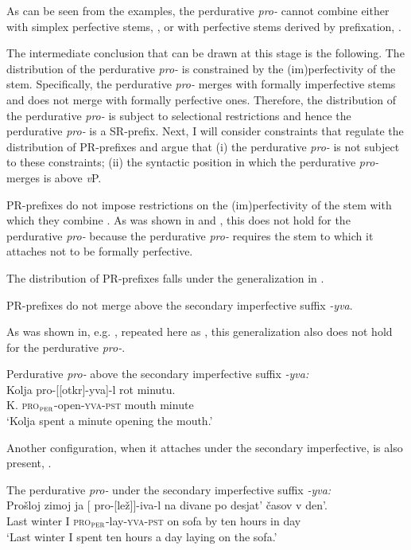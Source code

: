 \documentclass[output=paper,
]{langscibook}
\begin{document}
\noindent As can be seen from the examples, the perdurative \textit{pro-} cannot combine either with simplex perfective stems, , or with perfective stems derived by prefixation, .


The intermediate conclusion that can be drawn at this stage is the following. The distribution of the perdurative \textit{pro-} is constrained by the (im)perfectivity of the stem. Specifically, the perdurative \textit{pro-} merges with formally imperfective stems and does not merge with formally perfective ones. Therefore, the distribution of the perdurative \textit{pro-} is subject to selectional restrictions and hence the perdurative \textit{pro-} is a SR-prefix. Next, I will consider constraints that regulate the distribution of PR-prefixes and argue that (i) the perdurative \textit{pro-} is not subject to these constraints; (ii) the syntactic position in which the perdurative \textit{pro-} merges is above \textit{v}P.

PR-prefixes do not impose restrictions on the (im)perfectivity of the stem with which they combine \citep{tatevosov2009mnozestvennaja,tatevosov2013mnozestvennaja}. As was shown in  and , this does not hold for the perdurative \textit{pro-} because the perdurative \textit{pro-} requires the stem to which it attaches not to be formally perfective.

The distribution of PR-prefixes falls under the generalization in .

\ea \label{ex:naumov:15}
PR-prefixes do not merge above the secondary imperfective suffix \textit{-yva}.
\z

\noindent As was shown in, e.g. , repeated here as , this generalization also does not hold for the perdurative \textit{pro-}.
 

 \ea Perdurative \textit{pro-} above the secondary imperfective suffix \textit{-yva:}\label{ex:naumov:16}\smallskip\\
     \gll Kolja	pro-[[otkr]-yva]-l		rot		minutu.\\
K.	\textsc{pro}$_\textsc{per}$-open-\textsc{yva}-\textsc{pst}	mouth		minute\\
     \glt `Kolja spent a minute opening the mouth.'
     \z


\noindent Another configuration, when it attaches under the secondary imperfective, is also present, .

\ea The perdurative \textit{pro-} under the secondary imperfective suffix \textit{-yva:}\label{ex:naumov:17}\smallskip\\
    \gll Prošloj	zimoj	ja	[\hspace{-2pt} pro-[lež]]-iva-l	na	divane	po	desjat’ časov	v	den’.\\
    Last	winter	I	{} \textsc{pro}$_\textsc{per}$-lay-\textsc{yva}-\textsc{pst}	on	sofa	by	ten hours	in	day \\
    \glt `Last winter I spent ten hours a day laying on the sofa.'
    \z
\end{document}
